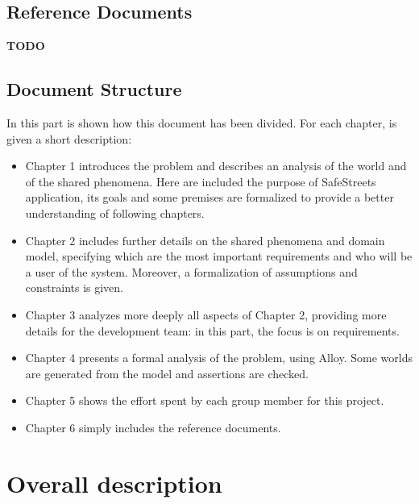 \documentclass{article}
\begin{document}
		\subsection{Reference Documents}
			\textbf{TODO}
		\subsection{Document Structure}
			In this part is shown how this document has been divided. For each chapter, is given a short description:
			\begin{itemize}
				\item Chapter 1 introduces the problem and describes an analysis of the world and of the shared phenomena. Here are included the purpose of SafeStreets application, its goals and some premises are formalized to provide a better understanding of following chapters.
				\item Chapter 2 includes further details on the shared phenomena and domain model, specifying which are the most important requirements and who will be a user of the system. Moreover, a formalization of assumptions and constraints is given.
				\item Chapter 3 analyzes more deeply all aspects of Chapter 2, providing more details for the development team: in this part, the focus is on requirements.
				\item Chapter 4 presents a formal analysis of the problem, using Alloy. Some worlds are generated from the model and assertions are checked.
				\item Chapter 5 shows the effort spent by each group member for this project.
				\item Chapter 6 simply includes the reference documents.
			\end{itemize}
	
	\newpage










	\section{Overall description}
\end{document}
